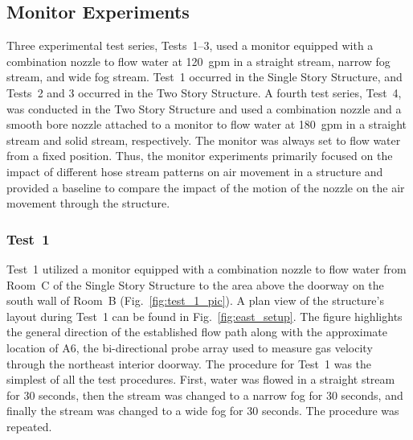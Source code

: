 \documentclass[12pt,oneside]{book}
\begin{document}
\subsection{Monitor Experiments}
\label{sec:monitor_procedure}
Three experimental test series, Tests~1--3, used a monitor equipped with a combination nozzle to flow water at 120~gpm in a straight stream, narrow fog stream, and wide fog stream. Test~1 occurred in the Single Story Structure, and Tests~2 and 3 occurred in the Two Story Structure. A fourth test series, Test~4, was conducted in the Two Story Structure and used a combination nozzle and a smooth bore nozzle attached to a monitor to flow water at 180~gpm in a straight stream and solid stream, respectively. The monitor was always set to flow water from a fixed position. Thus, the monitor experiments primarily focused on the impact of different hose stream patterns on air movement in a structure and provided a baseline to compare the impact of the motion of the nozzle on the air movement through the structure.

\subsubsection{Test~1}
Test~1 utilized a monitor equipped with a combination nozzle to flow water from Room~C of the Single Story Structure to the area above the doorway on the south wall of Room~B (Fig.~\ref{fig:test_1_pic}). A plan view of the structure's layout during Test~1 can be found in Fig.~\ref{fig:east_setup}. The figure highlights the general direction of the established flow path along with the approximate location of A6, the bi-directional probe array used to measure gas velocity through the northeast interior doorway. The procedure for Test~1 was the simplest of all the test procedures. First, water was flowed in a straight stream for 30 seconds, then the stream was changed to a narrow fog for 30 seconds, and finally the stream was changed to a wide fog for 30 seconds. The procedure was repeated.
\end{document}
